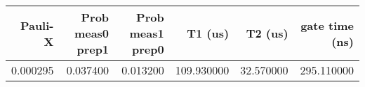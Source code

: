 \begin{tabular}{rrrrrr}
\toprule
Pauli-X & Prob meas0 prep1 & Prob meas1 prep0 & T1 (us) & T2 (us) & gate time (ns) \\
\midrule
0.000295 & 0.037400 & 0.013200 & 109.930000 & 32.570000 & 295.110000 \\
\bottomrule
\end{tabular}
